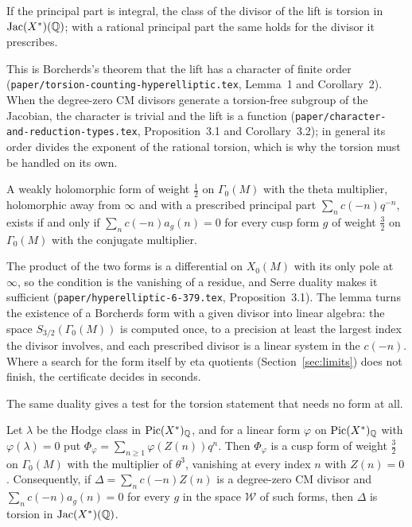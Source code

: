 \begin{lemma}\label{lem:borcherds-torsion}
If the principal part is integral, the class of the divisor of the lift is torsion in $\operatorname{Jac}(X^*)(\mathbb{Q})$; with a
rational principal part the same holds for the divisor it prescribes.
\end{lemma}

This is Borcherds's theorem that the lift has a character of finite order
(\texttt{paper/torsion-counting-hyperelliptic.tex}, Lemma~1 and Corollary~2). When the degree-zero CM divisors
generate a torsion-free subgroup of the Jacobian, the character is trivial and the lift is a function
(\texttt{paper/character-and-reduction-types.tex}, Proposition~3.1 and Corollary~3.2); in general its order
divides the exponent of the rational torsion, which is why the torsion must be handled on its own.

\begin{lemma}\label{lem:dual-certificate}
A weakly holomorphic form of weight $\tfrac12$ on $\Gamma_0(M)$ with the theta multiplier, holomorphic away
from $\infty$ and with a prescribed principal part $\sum_n c(-n)q^{-n}$, exists if and only if
$\sum_n c(-n)a_g(n)=0$ for every cusp form $g$ of weight $\tfrac32$ on $\Gamma_0(M)$ with the conjugate
multiplier.
\end{lemma}

The product of the two forms is a differential on $X_0(M)$ with its only pole at $\infty$, so the condition is
the vanishing of a residue, and Serre duality makes it sufficient (\texttt{paper/hyperelliptic-6-379.tex},
Proposition~3.1). The lemma turns the existence of a Borcherds form with a given divisor into linear algebra:
the space $S_{3/2}(\Gamma_0(M))$ is computed once, to a precision at least the largest index the divisor
involves, and each prescribed divisor is a linear system in the $c(-n)$. Where a search for the form itself by
eta quotients (Section~\ref{sec:limits}) does not finish, the certificate decides in seconds.

The same duality gives a test for the torsion statement that needs no form at all.

\begin{proposition}\label{prop:dual-test}
Let $\lambda$ be the Hodge class in $\operatorname{Pic}(X^*)_{\mathbb{Q}}$, and for a linear form $\varphi$ on $\operatorname{Pic}(X^*)_{\mathbb{Q}}$ with
$\varphi(\lambda)=0$ put $\Phi_\varphi=\sum_{n\ge1}\varphi(Z(n))q^n$. Then $\Phi_\varphi$ is a cusp form of
weight $\tfrac32$ on $\Gamma_0(M)$ with the multiplier of $\theta^3$, vanishing at every index $n$ with
$Z(n)=0$. Consequently, if $\Delta=\sum_n c(-n)Z(n)$ is a degree-zero CM divisor and
$\sum_n c(-n)a_g(n)=0$ for every $g$ in the space $\mathcal W$ of such forms, then $\Delta$ is torsion in
$\operatorname{Jac}(X^*)(\mathbb{Q})$.
\end{proposition}

